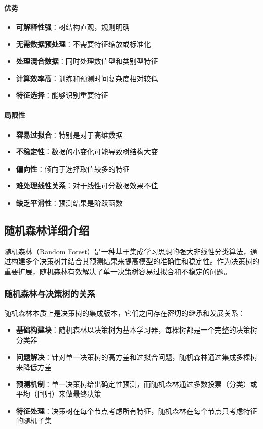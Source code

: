 \documentclass[UTF8]{report}
\theoremstyle{MyLineTheoremStyle} %
\theoremstyle{MyBlockTheoremStyle} %
\theoremstyle{MySubsubsectionStyle} %
\begin{document}
\paragraph{优势}
\begin{itemize}
    \item \textbf{可解释性强}：树结构直观，规则明确
    \item \textbf{无需数据预处理}：不需要特征缩放或标准化
    \item \textbf{处理混合数据}：同时处理数值型和类别型特征
    \item \textbf{计算效率高}：训练和预测时间复杂度相对较低
    \item \textbf{特征选择}：能够识别重要特征
\end{itemize}

\paragraph{局限性}
\begin{itemize}
    \item \textbf{容易过拟合}：特别是对于高维数据
    \item \textbf{不稳定性}：数据的小变化可能导致树结构大变
    \item \textbf{偏向性}：倾向于选择取值较多的特征
    \item \textbf{难处理线性关系}：对于线性可分数据效果不佳
    \item \textbf{缺乏平滑性}：预测结果是阶跃函数
\end{itemize}





\subsection{随机森林详细介绍}

随机森林（Random Forest）是一种基于集成学习思想的强大非线性分类算法，通过构建多个决策树并结合其预测结果来提高模型的准确性和稳定性。作为决策树的重要扩展，随机森林有效解决了单一决策树容易过拟合和不稳定的问题。

\subsubsection{随机森林与决策树的关系}

随机森林本质上是决策树的集成版本，它们之间存在密切的继承和发展关系：

\begin{itemize}
    \item \textbf{基础构建块}：随机森林以决策树为基本学习器，每棵树都是一个完整的决策树分类器
    \item \textbf{问题解决}：针对单一决策树的高方差和过拟合问题，随机森林通过集成多棵树来降低方差
    \item \textbf{预测机制}：单一决策树给出确定性预测，而随机森林通过多数投票（分类）或平均（回归）来做最终决策
    \item \textbf{特征处理}：决策树在每个节点考虑所有特征，随机森林在每个节点只考虑特征的随机子集
\end{itemize}
\end{document}
